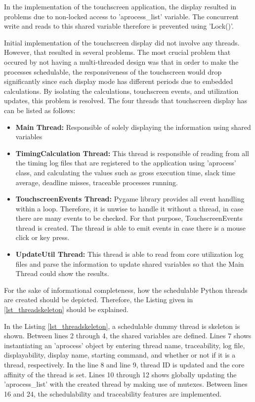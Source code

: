 In the implementation of the touchscreen application, the display resulted in problems due to non-locked access to 'aprocess{\_}list' variable. The concurrent write and reads to this shared variable therefore is prevented using 'Lock()'.

Initial implementation of the touchscreen display did not involve any threads. However, that resulted in several problems. The most crucial problem that occured by not having a multi-threaded design was that in order to make the processes schedulable, the responsiveness of the touchscreen would drop significantly since each display mode has different periods due to embedded calculations. By isolating the calculations, touchscreen events, and utilization updates, this problem is resolved. The four threads that touchscreen display has can be listed as follows:

\begin{itemize}
	\item \textbf{Main Thread:} Responsible of solely displaying the information using shared variables
	\item \textbf{TimingCalculation Thread:} This thread is responsible of reading from all the timing log files that are registered to the application using 'aprocess' class, and calculating the values such as gross execution time, slack time average, deadline misses, traceable processes running.
	\item \textbf{TouchscreenEvents Thread:} Pygame library provides all event handling within a loop. Therefore, it is unwise to handle it without a thread, in case there are many events to be checked. For that purpose, TouchscreenEvents thread is created. The thread is able to emit events in case there is a mouse click or key press.
	\item \textbf{UpdateUtil Thread:} This thread is able to read from core utilization log files and parse the information to update shared variables so that the Main Thread could show the results.
\end{itemize}

For the sake of informational completeness, how the schedulable Python threads are created should be depicted. Therefore, the Listing given in \ref{lst_threadskeleton} should be explained.



In the Listing \ref{lst_threadskeleton}, a schedulable dummy thread is skeleton is shown. Between lines 2 through 4, the shared variables are defined. Lines 7 shows instantiating an 'aprocess' object by entering thread name, traceability, log file, displayability, display name, starting command, and whether or not if it is a thread, respectively. In the line 8 and line 9, thread ID is updated and the core affinity of the thread is set. Lines 10 through 12 shows globally updating the 'aprocess{\_}list' with the created thread by making use of mutexes. Between lines 16 and 24, the schedulability and traceability features are implemented.

